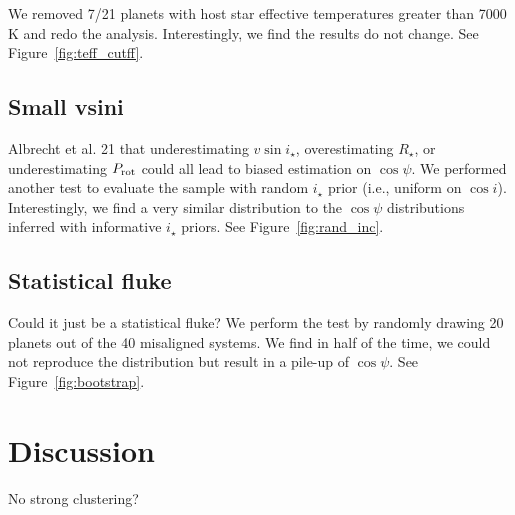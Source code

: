 \documentclass[twocolumn]{aastex631}
\begin{document}
We removed 7/21 planets with host star effective temperatures greater than 7000 K and redo the analysis. Interestingly, we find the results do not change. See Figure~\ref{fig:teff_cutff}.


\subsection{Small vsini}
Albrecht et al. 21 that underestimating $v\sin{i_\star}$, overestimating $R_\star$, or underestimating $P_{\rm rot}$ could all lead to biased estimation on $\cos{\psi}$. We performed another test to evaluate the sample with random $i_\star$ prior (i.e., uniform on $\cos{i}$). Interestingly, we find a very similar distribution to the $\cos{\psi}$ distributions inferred with informative $i_\star$ priors. See Figure~\ref{fig:rand_inc}.


\subsection{Statistical fluke}
Could it just be a statistical fluke? We perform the test by randomly drawing 20 planets out of the 40 misaligned systems. We find in half of the time, we could not reproduce the distribution but result in a pile-up of $\cos{\psi}$. See Figure~\ref{fig:bootstrap}.


\section{Discussion}
No strong clustering?


\end{document}
